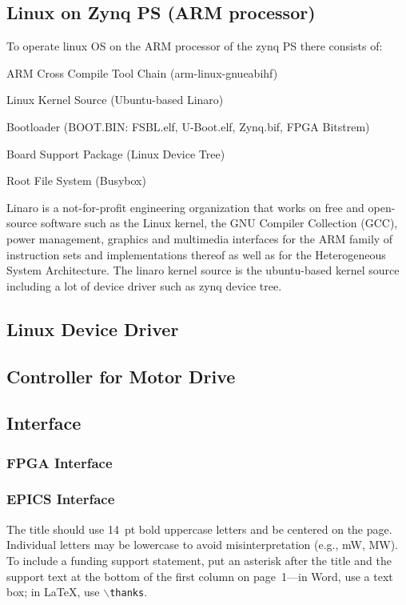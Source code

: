\documentclass[a4paper,
              ]{jacow}
\begin{document}
\subsection{Linux on Zynq PS (ARM processor)}
To operate linux OS on the ARM processor of the zynq PS there consists of:
\begin{Itemize}
	\item ARM Cross Compile Tool Chain (arm-linux-gnueabihf)
	\item Linux Kernel Source (Ubuntu-based Linaro)
	\item Bootloader (BOOT.BIN: FSBL.elf, U-Boot.elf, Zynq.bif, FPGA Bitstrem)
	\item Board Support Package (Linux Device Tree)
	\item Root File System (Busybox)
\end{Itemize}
Linaro is a not-for-profit engineering organization that works on free and open-source software such as the Linux kernel, the GNU Compiler Collection (GCC), power management, graphics and multimedia interfaces for the ARM family of instruction sets and implementations thereof as well as for the Heterogeneous System Architecture.\cite{linaro}   
The linaro kernel source is the ubuntu-based kernel source including a lot of device driver such as zynq device tree.


\subsection{Linux Device Driver}

\subsection{Controller for Motor Drive}

\subsection{Interface}
\subsubsection{FPGA Interface}
\subsubsection{EPICS Interface} 

The title should use \SI{14}{pt} bold uppercase letters and be centered on the page.
Individual letters may be lowercase to avoid misinterpretation (e.g., mW, MW).
To include a funding support statement, put an asterisk after the title and
the support text at the bottom of the first column on page~1---in Word,
use a text box; in \LaTeX, use $\backslash$\texttt{thanks}.
\end{document}

